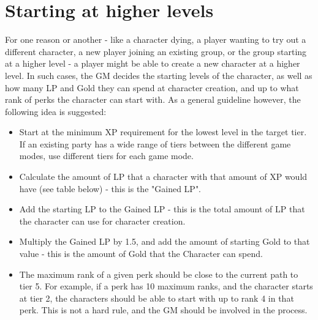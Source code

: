 \chapter{Starting at higher levels}\label{ch:createHigherLevelChars}
For one reason or another - like a character dying, a player wanting to try out a different character, a new player joining an existing group, or the group starting at a higher level - a player might be able to create a new character at a higher level.
In such cases, the GM decides the starting levels of the character, as well as how many LP and Gold they can spend at character creation, and up to what rank of perks the character can start with.
As a general guideline however, the following idea is suggested:
\begin{itemize}
	\item Start at the minimum XP requirement for the lowest level in the target tier.
	If an existing party has a wide range of tiers between the different game modes, use different tiers for each game mode.
	\item Calculate the amount of LP that a character with that amount of XP would have (see table below) - this is the "Gained LP".
	\item Add the starting LP to the Gained LP - this is the total amount of LP that the character can use for character creation.
	\item Multiply the Gained LP by 1.5, and add the amount of starting Gold to that value - this is the amount of Gold that the Character can spend.
	\item The maximum rank of a given perk should be close to the current path to tier 5.
	For example, if a perk has 10 maximum ranks, and the character starts at tier 2, the characters should be able to start with up to rank 4 in that perk.
	This is not a hard rule, and the GM should be involved in the process.
\end{itemize}